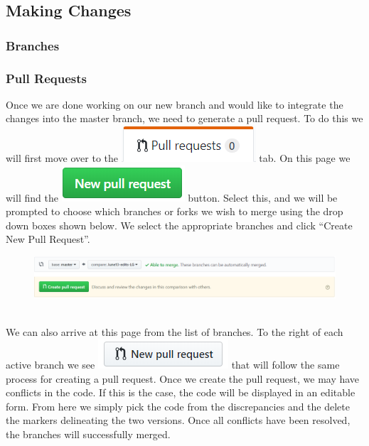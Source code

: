 \documentclass[11pt]{article}
\begin{document}
\subsection{Making Changes}

\hypertarget{branch-section}{\subsubsection{Branches}}


\subsubsection{Pull Requests}
Once we are done working on our new branch and would like to integrate the changes into the master branch, we need to generate a pull request. To do this we will first move over to the \includegraphics[scale=.75]{PullReqTab.png} tab. On this page we will find the \includegraphics[scale=.75]{NewPullReq.png} button. Select this, and we will be prompted to choose which branches or forks we wish to merge using the drop down boxes shown below. We select the appropriate branches and click ``Create New Pull Request''.  
\begin{figure}[h!]
\begin{center}
\includegraphics[scale=.5]{CompareBranches.png}
\end{center}
\end{figure} \\
We can also arrive at this page from the list of branches. To the right of each active branch we see \includegraphics[scale=.75]{PullFromBranchList.png} that will follow the same process for creating a pull request. Once we create the pull request, we may have conflicts in the code. If this is the case, the code will be displayed in an editable form. From here we simply pick the code from the discrepancies and the delete the markers delineating the two versions. Once all conflicts have been resolved, the branches will successfully merged.
\end{document}
